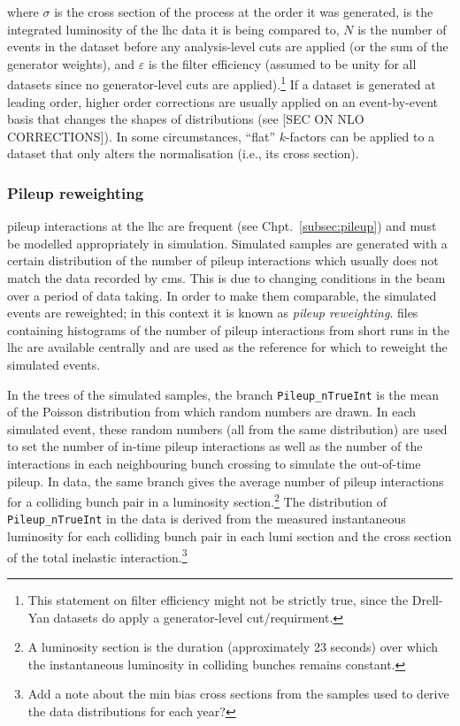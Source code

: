 where $\sigma$ is the cross section of the process at the order it was generated, \intlumi is the integrated luminosity of the \acrshort{lhc} data it is being compared to, $N$ is the number of events in the dataset before any analysis-level cuts are applied (or the sum of the generator weights), and $\varepsilon$ is the filter efficiency (assumed to be unity for all datasets since no generator-level cuts are applied).\footnote{This statement on filter efficiency might not be strictly true, since the Drell-Yan datasets do apply a generator-level cut/requirment.} If a dataset is generated at leading order, higher order corrections are usually applied on an event-by-event basis that changes the shapes of distributions (see [SEC ON NLO CORRECTIONS]). In some circumstances, ``flat'' $k$-factors can be applied to a dataset that only alters the normalisation (i.e., its cross section).




\subsubsection{Pileup reweighting}
\label{subsubsec:pu_reweighting}

\Gls{pileup} interactions at the \acrshort{lhc} are frequent (see Chpt.~\ref{subsec:pileup}) and must be modelled appropriately in simulation. Simulated samples are generated with a certain distribution of the number of \gls{pileup} interactions which usually does not match the data recorded by \acrshort{cms}. This is due to changing conditions in the beam over a period of data taking. In order to make them comparable, the simulated events are reweighted; in this context it is known as \emph{\gls{pileup} reweighting}. \ROOT files containing histograms of the number of \gls{pileup} interactions from short runs in the \acrshort{lhc} are available centrally and are used as the reference for which to reweight the simulated events.

In the trees of the simulated samples, the branch \texttt{Pileup\_nTrueInt} is the mean of the Poisson distribution from which random numbers are drawn. In each simulated event, these random numbers (all from the same distribution) are used to set the number of in-time \gls{pileup} interactions as well as the number of the interactions in each neighbouring bunch crossing to simulate the out-of-time \gls{pileup}. In data, the same branch gives the average number of \gls{pileup} interactions for a colliding bunch pair in a luminosity section.\footnote{A luminosity section is the duration (approximately 23 seconds) over which the instantaneous luminosity in colliding bunches remains constant.} The distribution of \texttt{Pileup\_nTrueInt} in the data is derived from the measured instantaneous luminosity for each colliding bunch pair in each lumi section and the cross section of the total inelastic \pp interaction.\footnote{Add a note about the min bias cross sections from the samples used to derive the data distributions for each year?}

